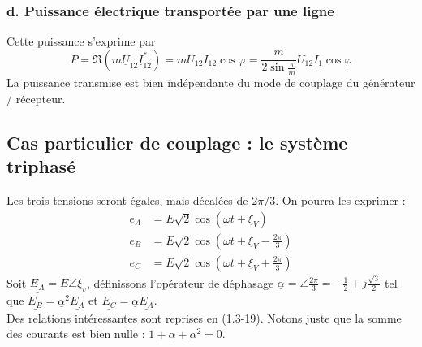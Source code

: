 		
\subsubsection{d. Puissance électrique transportée par une ligne}
Cette puissance s'exprime par 
\begin{equation}
	P = \Re(m\underline{U}_{12}\underline{I}_{12}^*) = mU_{12}I_{12}\cos
	\varphi = \frac{m}{2\sin\frac{\pi}{m}}U_{12}I_1\cos\varphi
\end{equation}
La puissance transmise est bien indépendante du mode de couplage du 
générateur / récepteur.
		
\subsection{Cas particulier de couplage : le système triphasé}
Les trois tensions seront égales, mais décalées de $2\pi/3$. On pourra 
les exprimer :
\begin{equation}
	\begin{array}{ll}
		e_A & = E\sqrt{2}\cos(\omega t +\xi_V)                  \\
		e_B & = E\sqrt{2}\cos(\omega t +\xi_V - \frac{2\pi}{3}) \\
		e_C & = E\sqrt{2}\cos(\omega t +\xi_V + \frac{2\pi}{3}) 
	\end{array}
\end{equation}
Soit $\underline{E_A}=E \angle \xi_v$, définissons l'opérateur de déphasage $\underline{\alpha} = \angle \frac{2
	\pi}{3} = -\frac{1}{2}+j\frac{\sqrt{3}}{2}$ tel que $\underline{E_B} = 
\underline{\alpha}^2\underline{E_A}$ et $\underline{E_C} = \underline{\alpha}
\underline{E_A}$.\\
Des relations intéressantes sont reprises en (1.3-19). Notons juste que 
la somme des courants est bien nulle : $1+\underline{\alpha}+\underline{
	\alpha}^2 = 0$.
		
